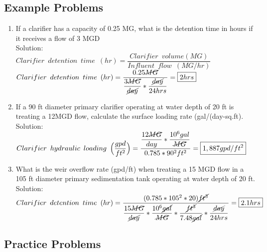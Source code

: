 \subsection{Example Problems} 
\begin{enumerate}
\item If a clarifier has a capacity of 0.25 MG, what is the detention time in hours if it receives a flow of 3 MGD\\
Solution:\\
$Clarifier \enspace detention \enspace time \enspace (hr) = 	\dfrac{ Clarifier \enspace volume (MG)}{Influent \enspace flow \enspace (MG/hr)}$\\
\vspace{0.5cm}
$Clarifier \enspace detention \enspace time \enspace (hr) = 	\dfrac{0.25\cancel{MG}}{\dfrac{3\cancel{MG}}{\cancel{day}}*\dfrac{\cancel{day}}{24hrs}}=\boxed{2hrs}$\\

\item If a 90 ft diameter primary clarifier operating at water depth of 20 ft is treating a 12MGD flow, calculate the surface loading rate (gal/(day-sq.ft).\\
Solution:\\
$Clarifier \enspace hydraulic \enspace loading \enspace 	\Big(\dfrac{gpd}{ft^2}\Big) =\dfrac{\dfrac{12\cancel{MG}}{{day}}*\dfrac{10^6gal}{\cancel{MG}}}{0.785*90^2 ft^2}=\boxed{1,887gpd/ft^2}$\\


\vspace{0.5cm}
\item What is the weir overflow rate (gpd/ft) when treating a 15 MGD flow in a 105 ft diameter primary sedimentation tank operating at water depth of 20 ft.\\
\vspace{0.5cm}
Solution:\\
\vspace{0.5cm}
$Clarifier \enspace detention \enspace time \enspace (hr) = 	\dfrac{(0.785*105^2*20)\cancel{ft^3}}{\dfrac{15\cancel{MG}}{\cancel{day}}*\dfrac{10^6\cancel{gal}}{\cancel{MG}}*\dfrac{\cancel{ft^3}}{7.48\cancel{gal}}*\dfrac{\cancel{day}}{24hrs}}=\boxed{2.1hrs}$\\
\end{enumerate}

\subsection{Practice Problems} 

